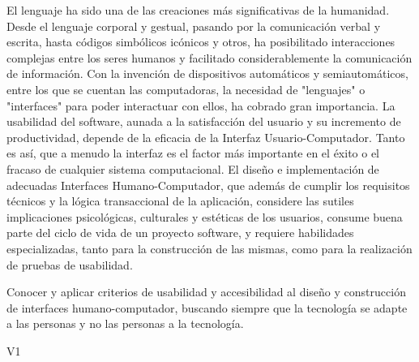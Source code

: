 \begin{syllabus}


\begin{justification}
El lenguaje ha sido una de las creaciones más significativas de la humanidad. Desde el lenguaje corporal y gestual, pasando por la comunicación verbal y escrita, hasta códigos simbólicos icónicos y otros, ha posibilitado interacciones complejas entre los seres humanos y facilitado considerablemente la comunicación de información. Con la invención de dispositivos automáticos y semiautomáticos, entre los que se cuentan las computadoras, la necesidad de "lenguajes" o "interfaces" para poder interactuar con ellos, ha cobrado gran importancia.
La usabilidad del software, aunada a la satisfacción del usuario y su incremento de productividad, depende de la eficacia de la Interfaz Usuario-Computador. Tanto es así­, que a menudo la interfaz es el factor más importante en el éxito o el fracaso de cualquier sistema computacional.
El diseño e implementación de adecuadas Interfaces Humano-Computador, que además de cumplir los requisitos técnicos y la lógica transaccional de la aplicación, considere las sutiles implicaciones psicológicas, culturales y estéticas de los usuarios, consume buena parte del ciclo de vida de un proyecto software, y requiere habilidades especializadas, tanto para la construcción de las mismas, como para la realización de pruebas de usabilidad.
\end{justification}

\begin{goals}
\item Conocer y aplicar criterios de usabilidad y accesibilidad al diseño y construcción de interfaces humano-computador, buscando siempre que la tecnología se adapte a las personas y no las personas a la tecnología.
\end{goals}

\begin{outcomes}{V1}
\end{outcomes}


\end{syllabus}
